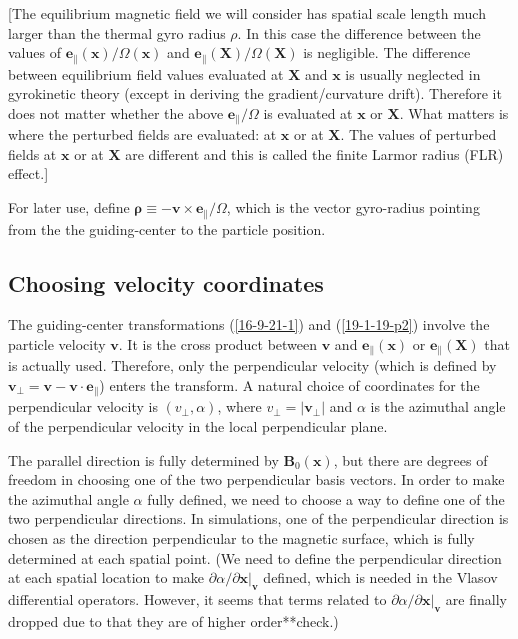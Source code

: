 \documentclass{llncs}
\newcommand{\nobracket}{}
\newcommand{\tmmathbf}[1]{\ensuremath{\boldsymbol{#1}}}
\newcommand{\tmtexttt}[1]{\text{{\ttfamily{#1}}}}
\begin{document}
[The equilibrium magnetic field we will consider has spatial scale length much
larger than the thermal gyro radius $\rho$. In this case the difference
between the values of $\mathbf{e}_{\parallel} (\mathbf{x}) / \Omega
(\mathbf{x})$ and $\mathbf{e}_{\parallel} (\mathbf{X}) / \Omega (\mathbf{X})$
is negligible. The difference between equilibrium field values evaluated at
$\mathbf{X}$ and $\mathbf{x}$ is usually neglected in gyrokinetic theory
(except in deriving the gradient/curvature drift). Therefore it does not
matter whether the above $\mathbf{e}_{\parallel} / \Omega$ is evaluated at
$\mathbf{x}$ or $\mathbf{X}$. What matters is where the perturbed fields are
evaluated: at $\mathbf{x}$ or at $\mathbf{X}$. The values of perturbed fields
at $\mathbf{x}$ or at $\mathbf{X}$ are different and this is called the finite
Larmor radius (FLR) effect.]

For later use, define $\tmmathbf{\rho} \equiv -\mathbf{v} \times
\mathbf{e}_{\parallel} / \Omega$, which is the vector gyro-radius pointing
from the the guiding-center to the particle position.

\subsection{Choosing velocity coordinates}

The guiding-center transformations (\ref{16-9-21-1}) and (\ref{19-1-19-p2})
involve the particle velocity $\mathbf{v}$. It is the cross product between
$\mathbf{v}$ and $\tmmathbf{e}_{\parallel} (\mathbf{x})$ or
$\tmmathbf{e}_{\parallel} (\mathbf{X})$ that is actually used. Therefore, only
the perpendicular velocity (which is defined by $\mathbf{v}_{\perp}
=\mathbf{v}-\mathbf{v} \cdot \mathbf{e}_{\parallel}$) enters the transform. A
natural choice of coordinates for the perpendicular velocity is $(v_{\perp},
\alpha)$, where $v_{\perp} = | \mathbf{v}_{\perp} |$ and $\alpha$ is the
azimuthal angle of the perpendicular velocity in the local perpendicular
plane.

The parallel direction is fully determined by $\mathbf{B}_0 (\mathbf{x})$, but
there are degrees of freedom in choosing one of the two perpendicular basis
vectors. In order to make the azimuthal angle $\alpha$ fully defined, we need
to choose a way to define one of the two perpendicular directions. In
\tmtexttt{GEM} simulations, one of the perpendicular direction is chosen as
the direction perpendicular to the magnetic surface, which is fully determined
at each spatial point. (We need to define the perpendicular direction at each
spatial location to make $\partial \alpha / \partial \mathbf{x} |_{\mathbf{v}}
\nobracket$ defined, which is needed in the Vlasov differential operators.
However, it seems that terms related to $\partial \alpha / \partial \mathbf{x}
|_{\mathbf{v}} \nobracket$ are finally dropped due to that they are of higher
order**check.)
\end{document}
